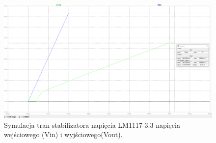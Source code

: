     \begin{figure}[H]
        \centering
        \includegraphics[width=1\linewidth]{images/psu_tran.png}
        \caption{Symulacja tran stabilizatora napięcia LM1117-3.3 napięcia wejściowego (Vin) i wyjściowego(Vout). }
    \end{figure}